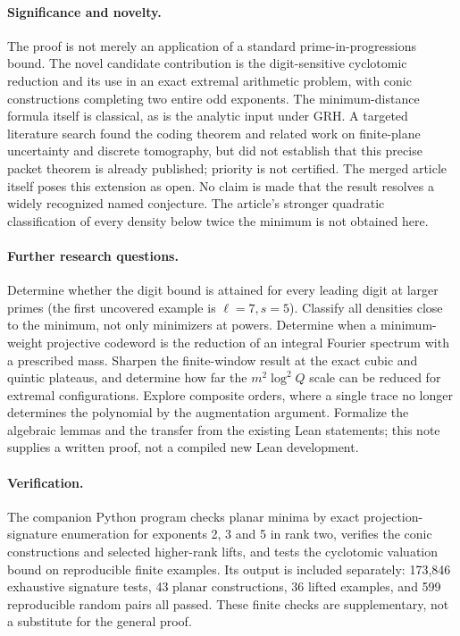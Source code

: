 \documentclass[11pt]{article}
\theoremstyle{remark}\newtheorem{remark}[theorem]{Remark}
\begin{document}
\paragraph{Significance and novelty.} The proof is not merely an application of a standard prime-in-progressions bound. The novel candidate contribution is the digit-sensitive cyclotomic reduction and its use in an exact extremal arithmetic problem, with conic constructions completing two entire odd exponents. The minimum-distance formula itself is classical, as is the analytic input under GRH. A targeted literature search found the coding theorem and related work on finite-plane uncertainty and discrete tomography, but did not establish that this precise packet theorem is already published; priority is not certified. The merged article itself poses this extension as open. No claim is made that the result resolves a widely recognized named conjecture. The article's stronger quadratic classification of every density below twice the minimum is not obtained here.

\paragraph{Further research questions.} Determine whether the digit bound is attained for every leading digit at larger primes (the first uncovered example is $\ell=7,s=5$). Classify all densities close to the minimum, not only minimizers at powers. Determine when a minimum-weight projective codeword is the reduction of an integral Fourier spectrum with a prescribed mass. Sharpen the finite-window result at the exact cubic and quintic plateaus, and determine how far the $m^2\log^2 Q$ scale can be reduced for extremal configurations. Explore composite orders, where a single trace no longer determines the polynomial by the augmentation argument. Formalize the algebraic lemmas and the transfer from the existing Lean statements; this note supplies a written proof, not a compiled new Lean development.

\paragraph{Verification.} The companion Python program checks planar minima by exact projection-signature enumeration for exponents 2, 3 and 5 in rank two, verifies the conic constructions and selected higher-rank lifts, and tests the cyclotomic valuation bound on reproducible finite examples. Its output is included separately: 173,846 exhaustive signature tests, 43 planar constructions, 36 lifted examples, and 599 reproducible random pairs all passed. These finite checks are supplementary, not a substitute for the general proof.
\end{document}
